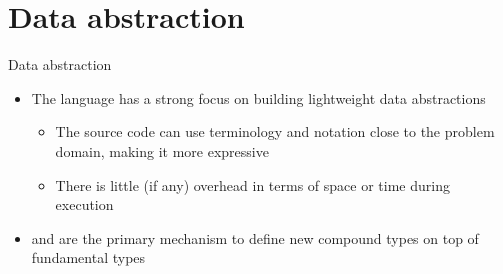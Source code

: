 

\section{Data abstraction}

\begin{frame}{Data abstraction}
  \begin{itemize}[<+->]
  \item The \Cpp{} language has a strong focus on building lightweight data
    abstractions
    \begin{itemize}
    \item The source code can use terminology and notation close to the problem
      domain, making it more expressive
    \item There is little (if any) overhead in terms of space or time during
      execution
    \end{itemize}
  \item {} and  are the primary mechanism to define new
    compound types on top of fundamental types
  \end{itemize}
\end{frame}

